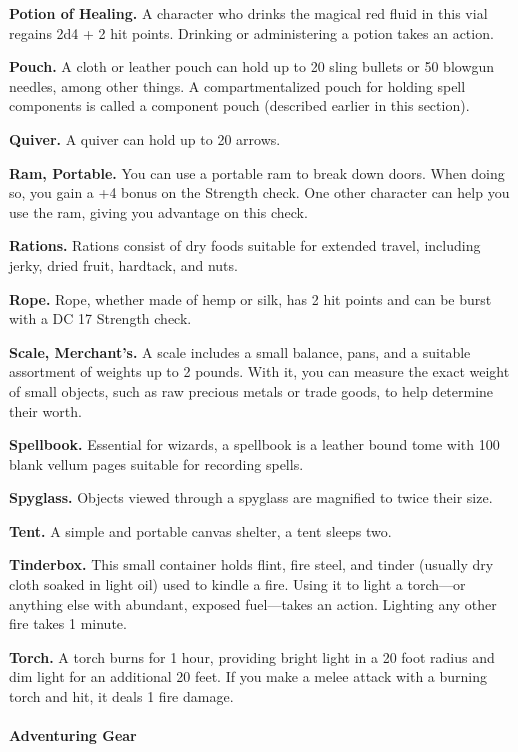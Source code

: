 \documentclass[
]{article}
\begin{document}
\textbf{Potion of Healing.} A character who drinks the magical red fluid
in this vial regains 2d4 + 2 hit points. Drinking or administering a
potion takes an action.

\textbf{Pouch.} A cloth or leather pouch can hold up to 20 sling bullets
or 50 blowgun needles, among other things. A compartmentalized pouch for
holding spell components is called a component pouch (described earlier
in this section).

\textbf{Quiver.} A quiver can hold up to 20 arrows.

\textbf{Ram, Portable.} You can use a portable ram to break down doors.
When doing so, you gain a +4 bonus on the Strength check. One other
character can help you use the ram, giving you advantage on this check.

\textbf{Rations.} Rations consist of dry foods suitable for extended
travel, including jerky, dried fruit, hardtack, and nuts.

\textbf{Rope.} Rope, whether made of hemp or silk, has 2 hit points and
can be burst with a DC 17 Strength check.

\textbf{Scale, Merchant's.} A scale includes a small balance, pans, and
a suitable assortment of weights up to 2 pounds. With it, you can
measure the exact weight of small objects, such as raw precious metals
or trade goods, to help determine their worth.

\textbf{Spellbook.} Essential for wizards, a spellbook is a leather
bound tome with 100 blank vellum pages suitable for recording spells.

\textbf{Spyglass.} Objects viewed through a spyglass are magnified to
twice their size.

\textbf{Tent.} A simple and portable canvas shelter, a tent sleeps two.

\textbf{Tinderbox.} This small container holds flint, fire steel, and
tinder (usually dry cloth soaked in light oil) used to kindle a fire.
Using it to light a torch---or anything else with abundant, exposed
fuel---takes an action. Lighting any other fire takes 1 minute.

\textbf{Torch.} A torch burns for 1 hour, providing bright light in a 20
foot radius and dim light for an additional 20 feet. If you make a melee
attack with a burning torch and hit, it deals 1 fire damage.

\hypertarget{adventuring-gear-1}{%
\paragraph{Adventuring Gear}\label{adventuring-gear-1}}
\end{document}
